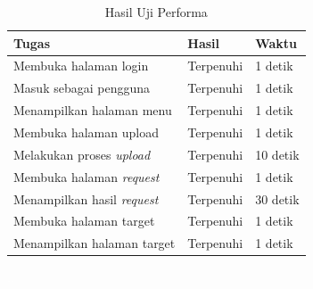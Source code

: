 \begin{table}
\centering
\begin{tabular}{|p{5cm}|p{2.5cm}|p{2cm}|}
\hline
\textbf{Tugas} & \textbf{Hasil} & \textbf{Waktu}\\ \hline
Membuka halaman login & Terpenuhi & 1 detik\\ \hline
Masuk sebagai pengguna & Terpenuhi & 1 detik\\ \hline
Menampilkan halaman menu & Terpenuhi & 1 detik\\ \hline
Membuka halaman upload & Terpenuhi & 1 detik\\ \hline
Melakukan proses \textit{upload} & Terpenuhi & 10 detik\\ \hline
Membuka halaman \textit{request} & Terpenuhi & 1 detik\\ \hline
Menampilkan hasil \textit{request} & Terpenuhi & 30 detik\\ \hline
Membuka halaman target & Terpenuhi & 1 detik\\ \hline
Menampilkan halaman target & Terpenuhi & 1 detik\\ \hline
\end{tabular}\caption{Hasil Uji Performa}
		\label{tab:evaluasi_performa}
\end{table}

\vspace{4 cm}
\textcolor{white}{..}